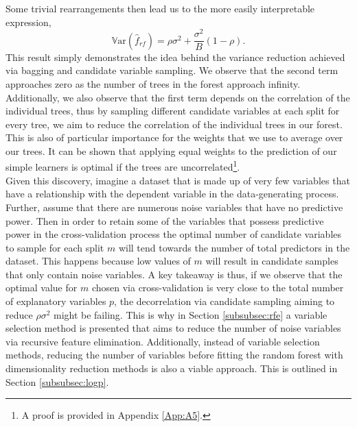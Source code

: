 \documentclass[a4paper,12pt, headsepline]{scrartcl}
\numberwithin{equation}{section}
\begin{document}
Some trivial rearrangements then lead us to the more easily interpretable expression,
\[
\mathbb{V}\text{ar}(\hat f_{rf}) = \rho\sigma^2 + \frac{\sigma^2}{B}(1 - \rho).
\]
This result simply demonstrates the idea behind the variance reduction achieved via bagging and candidate variable sampling. We observe that the second term approaches zero as the number of trees in the forest approach infinity. Additionally, we also observe that the first term depends on the correlation of the individual trees, thus by sampling different candidate variables at each split for every tree, we aim to reduce the correlation of the individual trees in our forest. This is also of particular importance for the weights that we use to average over our trees. It can be shown that applying equal weights to the prediction of our simple learners is optimal if the trees are uncorrelated\footnote{A proof is provided in Appendix \ref{App:A5}.}.\\
Given this discovery, imagine a dataset that is made up of very few variables that have a relationship with the dependent variable in the data-generating process. Further, assume that there are numerous noise variables that have no predictive power. Then in order to retain some of the variables that possess predictive power in the cross-validation process the optimal number of candidate variables to sample for each split $m$ will tend towards the number of total predictors in the dataset. This happens because low values of $m$ will result in candidate samples that only contain noise variables. A key takeaway is thus, if we observe that the optimal value for $m$ chosen via cross-validation is very close to the total number of explanatory variables $p$, the decorrelation via candidate sampling aiming to reduce $\rho\sigma^2$ might be failing. This is why in Section \ref{subsubsec:rfe} a variable selection method is presented that aims to reduce the number of noise variables via recursive feature elimination. Additionally, instead of variable selection methods, reducing the number of variables before fitting the random forest with dimensionality reduction methods is also a viable approach. This is outlined in Section \ref{subsubsec:logp}.
\end{document}
